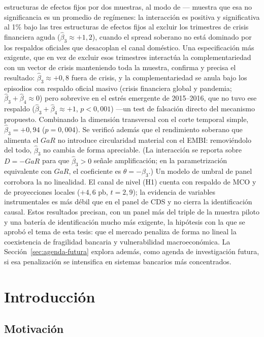 estructuras de efectos fijos por dos muestras, al modo de \citet{Chari2024b}— muestra que esa no significancia es un promedio de regímenes: la interacción es positiva y significativa al 1\% bajo las tres estructuras de efectos fijos al excluir los trimestres de crisis financiera aguda ($\hat\beta_3\approx+1{,}2$), cuando el spread soberano no está dominado por los respaldos oficiales que desacoplan el canal doméstico. Una especificación más exigente, que en vez de excluir esos trimestres interactúa la complementariedad con un vector de crisis manteniendo toda la muestra, confirma y precisa el resultado: $\hat\beta_3\approx+0{,}8$ fuera de crisis, y la complementariedad se anula bajo los episodios con respaldo oficial masivo (crisis financiera global y pandemia; $\hat\beta_3+\hat\beta_4\approx0$) pero sobrevive en el estrés emergente de 2015--2016, que no tuvo ese respaldo ($\hat\beta_3+\hat\beta_4\approx+1$, $p<0{,}001$) —un test de falsación directo del mecanismo propuesto. Combinando la dimensión transversal con el corte temporal simple, $\hat\beta_3=+0{,}94$ ($p=0{,}004$). Se verificó además que el rendimiento soberano que alimenta el $GaR$ no introduce circularidad material con el EMBI: removiéndolo del todo, $\hat\beta_3$ no cambia de forma apreciable. (La interacción se reporta sobre $D=-GaR$ para que $\hat\beta_3>0$ señale amplificación; en la parametrización equivalente con $GaR$, el coeficiente es $\theta=-\beta_3$.) Un modelo de umbral de panel \citep{Hansen1999,Hansen2000} corrobora la no linealidad. El canal de nivel (H1) cuenta con respaldo de MCO y de proyecciones locales ($+4{,}6$ pb, $t=2{,}9$); la evidencia de variables instrumentales es más débil que en el panel de CDS y no cierra la identificación causal. Estos resultados precisan, con un panel más del triple de la muestra piloto y una batería de identificación mucho más exigente, la hipótesis con la que se aprobó el tema de esta tesis: que el mercado penaliza de forma no lineal la coexistencia de fragilidad bancaria y vulnerabilidad macroeconómica. La Sección~\ref{sec:agenda-futura} explora además, como agenda de investigación futura, si esa penalización se intensifica en sistemas bancarios más concentrados.

\section{Introducción}

\subsection{Motivación}

